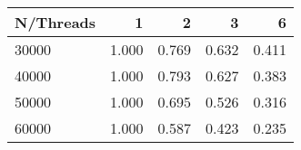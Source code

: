 \begin{tabular}{lrrrr}
\toprule
N/Threads & 1 & 2 & 3 & 6 \\
\midrule
30000 & 1.000 & 0.769 & 0.632 & 0.411 \\
40000 & 1.000 & 0.793 & 0.627 & 0.383 \\
50000 & 1.000 & 0.695 & 0.526 & 0.316 \\
60000 & 1.000 & 0.587 & 0.423 & 0.235 \\
\bottomrule
\end{tabular}
